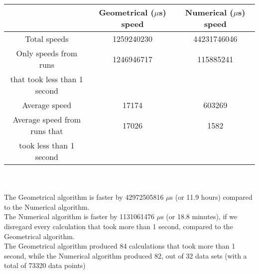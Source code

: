 \begin{tabular}[3]{c|c|c}
 & Geometrical ($\mu$s) speed & Numerical ($\mu$s) speed\\
\hline
Total speeds & 1259240230 & 44231746046 \\ 
\hline 
Only speeds from runs & 1246946717 & 115885241 \\ 
that took less than 1 second & & \\ 
\hline
Average speed & 17174 & 603269 \\
\hline
Average speed from runs that & 17026 & 1582 \\ 
took less than 1 second & & \\ 
\end{tabular}\\ \\
The Geometrical algorithm is faster by 42972505816 $\mu$s (or 11.9 hours) compared to the Numerical algorithm.\\
The Numerical algorithm is faster by 1131061476 $\mu$s (or 18.8 minutes), if we disregard every calculation that took more than 1 second, compared to the Geometrical algorithm.\\
The Geometrical algorithm produced 84 calculations that took more than 1 second, while the Numerical algorithm produced 82, out of 32 data sets (with a total of 73320 data points)\\
